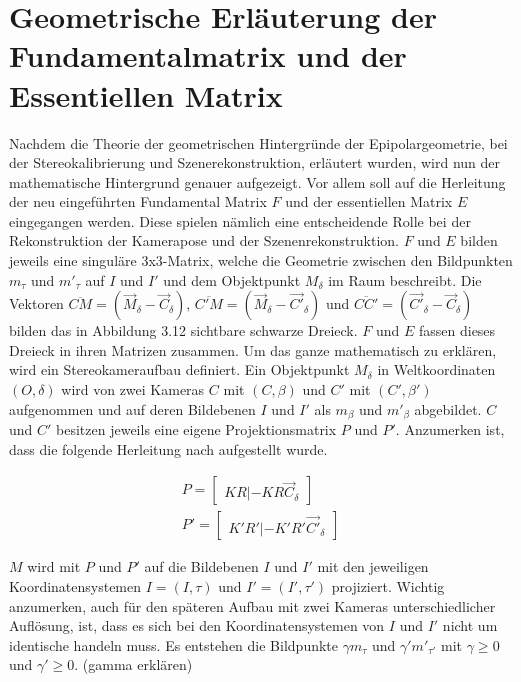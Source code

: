 \section{Geometrische Erläuterung der Fundamentalmatrix und der Essentiellen Matrix }

Nachdem die Theorie der geometrischen Hintergründe der Epipolargeometrie, bei der Stereokalibrierung und Szenerekonstruktion, erläutert wurden, wird nun der mathematische Hintergrund genauer aufgezeigt. Vor allem soll auf die Herleitung der neu eingeführten Fundamental Matrix $F$ und der essentiellen Matrix $E$ eingegangen werden. Diese spielen nämlich eine entscheidende Rolle bei der Rekonstruktion der Kamerapose und der Szenenrekonstruktion\cite{Elements, HZ}. $F$ und $E$ bilden jeweils eine singuläre 3x3-Matrix, welche die Geometrie zwischen den Bildpunkten $m_\tau$ und $m'_\tau$ auf $I$ und $I'$ und dem Objektpunkt $M_\delta$ im Raum beschreibt. Die Vektoren $\overline{CM} = (\vec{M}_\delta - \vec{C}_\delta),\, \overline{C'M} = (\vec{M}_\delta - \vec{C'}_\delta)$ und $\overline{CC'} = (\vec{C'}_\delta - \vec{C}_\delta)$ bilden das in Abbildung 3.12 sichtbare schwarze Dreieck. $F$ und $E$ fassen dieses Dreieck in ihren Matrizen zusammen. Um das ganze mathematisch zu erklären, wird ein Stereokameraufbau definiert. Ein Objektpunkt $M_\delta$ in Weltkoordinaten$(O,\delta)$ wird von zwei Kameras $C$ mit $(C,\beta)$ und $C'$ mit $(C',\beta')$ aufgenommen und auf deren Bildebenen $I$ und $I'$ als $m_\beta$ und $m'_\beta$ abgebildet. $C$ und $C'$ besitzen jeweils eine eigene Projektionsmatrix $P$ und $P'$. Anzumerken ist, dass die folgende Herleitung nach \cite{Elements} aufgestellt wurde.

\begin{gather}
	P = \begin{bmatrix}
	KR|-KR\vec{C}_\delta
	\end{bmatrix}\\
	P' = \begin{bmatrix}
	K'R'|-K'R'\vec{C'}_\delta
	\end{bmatrix}
\end{gather}

$M$ wird mit $P$ und $P'$ auf die Bildebenen $I$ und $I'$ mit den jeweiligen Koordinatensystemen $I = (I,\tau)$ und $I'= (I',\tau')$ projiziert. Wichtig anzumerken, auch für den späteren Aufbau mit zwei Kameras unterschiedlicher Auflösung, ist, dass es sich bei den Koordinatensystemen von $I$ und $I'$ nicht um identische handeln muss.\cite{Elements} Es entstehen die Bildpunkte $\gamma m_\tau$ und $\gamma' m'_{\tau'}$ mit $\gamma \geq 0$ und $\gamma' \geq 0$. (gamma erklären)

